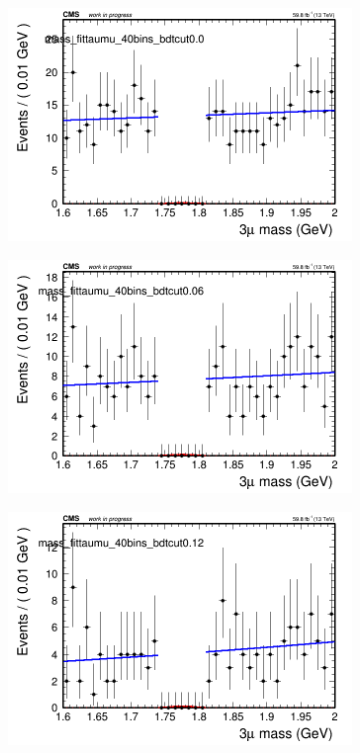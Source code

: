 \begin{figure}[H]
    \centering
    \begin{subfigure}{0.2\textwidth}
        \includegraphics[width=\textwidth]{unfixed_exp/plots/taumu/massfit_taumu_40bins_bdtcut0.0.png}
        \caption{}
    \end{subfigure}
    \begin{subfigure}{0.2\textwidth}
        \includegraphics[width=\textwidth]{unfixed_exp/plots/taumu/massfit_taumu_40bins_bdtcut0.06.png}
        \caption{}
    \end{subfigure}
    \begin{subfigure}{0.2\textwidth}
        \includegraphics[width=\textwidth]{unfixed_exp/plots/taumu/massfit_taumu_40bins_bdtcut0.12.png}

\end{subfigure}
\end{figure}
